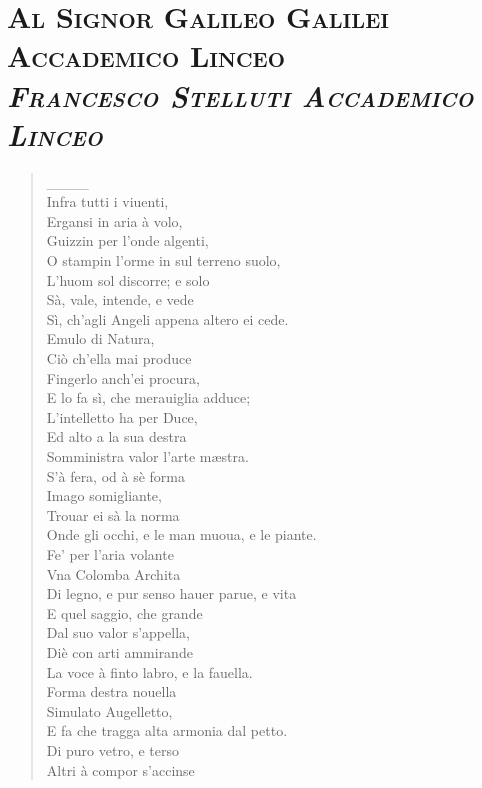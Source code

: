 \documentclass[11pt,twoside,openany]{book}
\begin{document}
\clearpage
\section*{\centering\scshape Al Signor Galileo Galilei Accademico Linceo\\{\small\itshape Francesco Stelluti Accademico Linceo}}
\begin{verse}

\_\_\_\_ \\[0.8em]
Infra tutti i viuenti, \\
Ergansi in aria à volo, \\
Guizzin per l'onde algenti, \\
O stampin l'orme in sul terreno suolo, \\
L'huom sol discorre; e solo \\
Sà, vale, intende, e vede \\
Sì, ch'agli Angeli appena altero ei cede. \\[0.8em]
Emulo di Natura, \\
Ciò ch'ella mai produce \\
Fingerlo anch'ei procura, \\
E lo fa sì, che merauiglia adduce; \\
L'intelletto ha per Duce, \\
Ed alto a la sua destra \\
Somministra valor l'arte mæstra. \\[0.8em]
S'à fera, od à sè forma \\
Imago somigliante, \\
Trouar ei sà la norma \\
Onde gli occhi, e le man muoua, e le piante. \\
Fe' per l'aria volante \\
Vna Colomba Archita \\
Di legno, e pur senso hauer parue, e vita \\[0.8em]
E quel saggio, che grande \\
Dal suo valor s'appella, \\
Diè con arti ammirande \\
La voce à finto labro, e la fauella. \\
Forma destra nouella \\
Simulato Augelletto, \\
E fa che tragga alta armonia dal petto. \\[0.8em]
Di puro vetro, e terso \\
Altri à compor s'accinse \\

\end{verse}
\end{document}
